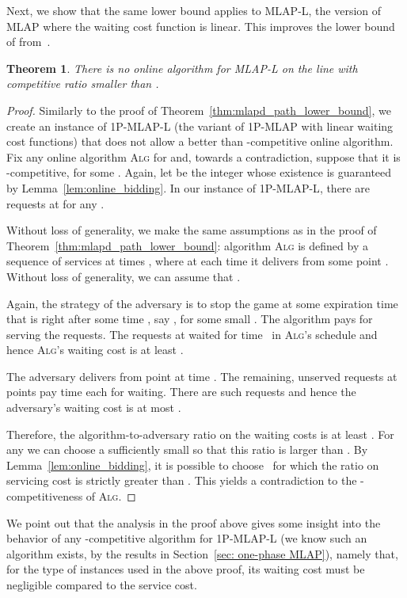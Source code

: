 \documentclass[a4paper]{article}
\newtheorem{theorem}{Theorem}[section]
\newcommand{\MLAP}{\mbox{\rm\textsf{MLAP}}}
\newcommand{\MLAPL}{\mbox\rm{\textsf{MLAP-L}}}
\newcommand{\SPMLAP}{\mbox{\rm\textsf{1P-MLAP}}}
\newcommand{\SPMLAPL}{\mbox{\rm\textsf{1P-MLAP-L}}}
\newcommand{\ALG}{\textsc{Alg}}
\begin{document}
Next, we show that the same lower bound applies to {\MLAPL}, the version of
{\MLAP} where the waiting cost function is linear. This improves the lower
bound of  from~\cite{aggregation_wads_2013}.


\begin{theorem}
\label{thm:mlapl_path_lower_bound}
There is no online algorithm for {\MLAPL} on the line with competitive ratio smaller than .
\end{theorem}

\begin{proof}
Similarly to the proof of Theorem~\ref{thm:mlapd_path_lower_bound}, we create an instance of 
{\SPMLAPL} (the variant of {\SPMLAP} with linear waiting cost functions)
that does not allow a better than -competitive online algorithm.
Fix any online algorithm {\ALG} for 
and, towards a contradiction, suppose that it is -competitive, for some .
Again, let  be the integer whose existence is guaranteed by Lemma~\ref{lem:online_bidding}.
In our instance of {\SPMLAPL}, there are  requests at  for any 
. 

Without loss of generality, we make the same assumptions as in the proof of
Theorem~\ref{thm:mlapd_path_lower_bound}: algorithm {\ALG} is defined by
a sequence of services at times ,
where at each time  it delivers from some point . Without loss of generality,
we can assume that . 

Again, the strategy of the adversary is to stop the game at some expiration time 
that is right after some time , say , for some small .
The algorithm pays  for serving the requests. The  
requests at  waited for time~ in {\ALG}'s schedule 
and hence {\ALG}'s waiting cost is at least . 

The adversary delivers from point  at time .
The remaining, unserved requests at points 
pay time  each for waiting. 
There are  
such requests and hence the adversary's waiting cost is at most 
.

Therefore, the algorithm-to-adversary ratio on the waiting costs is 
at least . For any  we can choose a sufficiently small 
so that this ratio is larger than .
By Lemma~\ref{lem:online_bidding}, it is possible to choose~ for which
the ratio on servicing cost is strictly greater than . 
This yields a contradiction to the -competitiveness of {\ALG}.
\end{proof}

We point out that
the analysis in the proof above gives some insight into the behavior of any
-competitive algorithm for {\SPMLAPL} (we know such an algorithm
exists, by the results in Section~\ref{sec: one-phase MLAP}), namely that,
for the type of instances used in the above proof,
its waiting cost must be negligible compared to the service cost.
\end{document}
